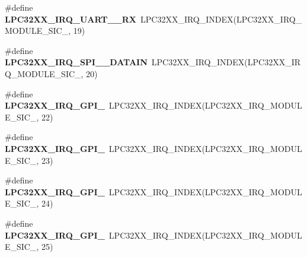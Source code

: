 \begin{DoxyCompactItemize}
\item 
\mbox{\label{group__lpc32xx__interrupt_gad776099f69bd9bf8b7a436f82cf1fb98}} 
\#define {\bfseries L\+P\+C32\+X\+X\+\_\+\+I\+R\+Q\+\_\+\+U\+A\+R\+T\+\_\+\_\+\+RX}~L\+P\+C32\+X\+X\+\_\+\+I\+R\+Q\+\_\+\+I\+N\+D\+EX(L\+P\+C32\+X\+X\+\_\+\+I\+R\+Q\+\_\+\+M\+O\+D\+U\+L\+E\+\_\+\+S\+I\+C\+\_, 19)
\item 
\mbox{\label{group__lpc32xx__interrupt_gae646e8aba1007c8cb1db34c9dc72ee1f}} 
\#define {\bfseries L\+P\+C32\+X\+X\+\_\+\+I\+R\+Q\+\_\+\+S\+P\+I\+\_\+\_\+\+D\+A\+T\+A\+IN}~L\+P\+C32\+X\+X\+\_\+\+I\+R\+Q\+\_\+\+I\+N\+D\+EX(L\+P\+C32\+X\+X\+\_\+\+I\+R\+Q\+\_\+\+M\+O\+D\+U\+L\+E\+\_\+\+S\+I\+C\+\_, 20)
\item 
\mbox{\label{group__lpc32xx__interrupt_gaf4be3750785c2136d0394cb96f0d2540}} 
\#define {\bfseries L\+P\+C32\+X\+X\+\_\+\+I\+R\+Q\+\_\+\+G\+P\+I\+\_}~L\+P\+C32\+X\+X\+\_\+\+I\+R\+Q\+\_\+\+I\+N\+D\+EX(L\+P\+C32\+X\+X\+\_\+\+I\+R\+Q\+\_\+\+M\+O\+D\+U\+L\+E\+\_\+\+S\+I\+C\+\_, 22)
\item 
\mbox{\label{group__lpc32xx__interrupt_ga6276428099f87679c86fb1b7d692de6e}} 
\#define {\bfseries L\+P\+C32\+X\+X\+\_\+\+I\+R\+Q\+\_\+\+G\+P\+I\+\_}~L\+P\+C32\+X\+X\+\_\+\+I\+R\+Q\+\_\+\+I\+N\+D\+EX(L\+P\+C32\+X\+X\+\_\+\+I\+R\+Q\+\_\+\+M\+O\+D\+U\+L\+E\+\_\+\+S\+I\+C\+\_, 23)
\item 
\mbox{\label{group__lpc32xx__interrupt_ga7c843e7ed08d764bda8a4132580141b1}} 
\#define {\bfseries L\+P\+C32\+X\+X\+\_\+\+I\+R\+Q\+\_\+\+G\+P\+I\+\_}~L\+P\+C32\+X\+X\+\_\+\+I\+R\+Q\+\_\+\+I\+N\+D\+EX(L\+P\+C32\+X\+X\+\_\+\+I\+R\+Q\+\_\+\+M\+O\+D\+U\+L\+E\+\_\+\+S\+I\+C\+\_, 24)
\item 
\mbox{\label{group__lpc32xx__interrupt_ga7dfde336d19ec2399391274d63fc3562}} 
\#define {\bfseries L\+P\+C32\+X\+X\+\_\+\+I\+R\+Q\+\_\+\+G\+P\+I\+\_}~L\+P\+C32\+X\+X\+\_\+\+I\+R\+Q\+\_\+\+I\+N\+D\+EX(L\+P\+C32\+X\+X\+\_\+\+I\+R\+Q\+\_\+\+M\+O\+D\+U\+L\+E\+\_\+\+S\+I\+C\+\_, 25)
\item 
\mbox{\label{group__lpc32xx__interrupt_ga9c374080d0788477595c48617ef22d73}} 

\end{DoxyCompactItemize}

